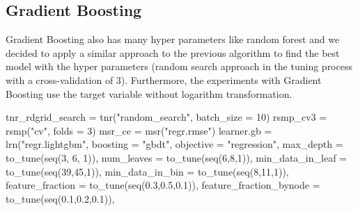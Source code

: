\documentclass[11pt,a4paper]{article}
\newenvironment{Shaded}{\begin{snugshade}}{\end{snugshade}}
\newcommand{\AttributeTok}[1]{\textcolor[rgb]{0.77,0.63,0.00}{#1}}
\newcommand{\DecValTok}[1]{\textcolor[rgb]{0.00,0.00,0.81}{#1}}
\newcommand{\FloatTok}[1]{\textcolor[rgb]{0.00,0.00,0.81}{#1}}
\newcommand{\FunctionTok}[1]{\textcolor[rgb]{0.00,0.00,0.00}{#1}}
\newcommand{\NormalTok}[1]{#1}
\newcommand{\OtherTok}[1]{\textcolor[rgb]{0.56,0.35,0.01}{#1}}
\newcommand{\StringTok}[1]{\textcolor[rgb]{0.31,0.60,0.02}{#1}}
\begin{document}
\hypertarget{gradient-boosting}{%
\subsection{Gradient Boosting}\label{gradient-boosting}}

Gradient Boosting also has many hyper parameters like random forest and
we decided to apply a similar approach to the previous algorithm to find
the best model with the hyper parameters (random search approach in the
tuning process with a cross-validation of 3). Furthermore, the
experiments with Gradient Boosting use the target variable without
logarithm transformation.

\begin{Shaded}
\begin{Highlighting}[]
\NormalTok{tnr\_rdgrid\_search }\OtherTok{=} \FunctionTok{tnr}\NormalTok{(}\StringTok{"random\_search"}\NormalTok{, }\AttributeTok{batch\_size =} \DecValTok{10}\NormalTok{)}
\NormalTok{rsmp\_cv3 }\OtherTok{=} \FunctionTok{rsmp}\NormalTok{(}\StringTok{"cv"}\NormalTok{, }\AttributeTok{folds =} \DecValTok{3}\NormalTok{)}
\NormalTok{msr\_ce }\OtherTok{=} \FunctionTok{msr}\NormalTok{(}\StringTok{"regr.rmse"}\NormalTok{)}
\NormalTok{learner.gb }\OtherTok{=} \FunctionTok{lrn}\NormalTok{(}\StringTok{"regr.lightgbm"}\NormalTok{,}
                 \AttributeTok{boosting =} \StringTok{"gbdt"}\NormalTok{,}
                 \AttributeTok{objective =} \StringTok{"regression"}\NormalTok{,}
                 \AttributeTok{max\_depth =} \FunctionTok{to\_tune}\NormalTok{(}\FunctionTok{seq}\NormalTok{(}\DecValTok{3}\NormalTok{, }\DecValTok{6}\NormalTok{, }\DecValTok{1}\NormalTok{)),}
                 \AttributeTok{num\_leaves =} \FunctionTok{to\_tune}\NormalTok{(}\FunctionTok{seq}\NormalTok{(}\DecValTok{6}\NormalTok{,}\DecValTok{8}\NormalTok{,}\DecValTok{1}\NormalTok{)),}
                 \AttributeTok{min\_data\_in\_leaf =} \FunctionTok{to\_tune}\NormalTok{(}\FunctionTok{seq}\NormalTok{(}\DecValTok{39}\NormalTok{,}\DecValTok{45}\NormalTok{,}\DecValTok{1}\NormalTok{)),}
                 \AttributeTok{min\_data\_in\_bin =} \FunctionTok{to\_tune}\NormalTok{(}\FunctionTok{seq}\NormalTok{(}\DecValTok{8}\NormalTok{,}\DecValTok{11}\NormalTok{,}\DecValTok{1}\NormalTok{)),}
                 \AttributeTok{feature\_fraction =} \FunctionTok{to\_tune}\NormalTok{(}\FunctionTok{seq}\NormalTok{(}\FloatTok{0.3}\NormalTok{,}\FloatTok{0.5}\NormalTok{,}\FloatTok{0.1}\NormalTok{)),}
                 \AttributeTok{feature\_fraction\_bynode =} \FunctionTok{to\_tune}\NormalTok{(}\FunctionTok{seq}\NormalTok{(}\FloatTok{0.1}\NormalTok{,}\FloatTok{0.2}\NormalTok{,}\FloatTok{0.1}\NormalTok{)),}

\end{Highlighting}
\end{Shaded}
\end{document}
